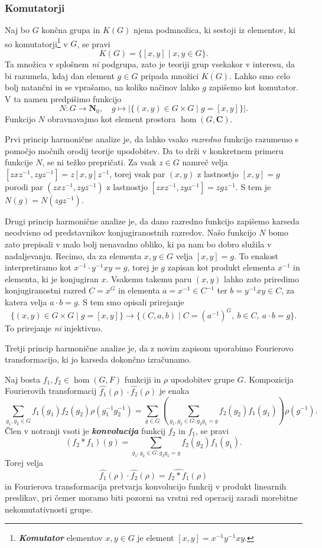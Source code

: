 \documentclass[11pt]{book}
\def\NN{\mathbf{N}}
\def\CC{\mathbf{C}}
\def\conclass{C}
\def\definicija{\color{rdeca}\bf\em}
\theoremstyle{definition}
\theoremstyle{zgled}
\theoremstyle{odprtproblem}
\theoremstyle{domacanaloga}
\theoremstyle{izrek}
\begin{document}
\subsubsection{Komutatorji}

Naj bo $G$ končna grupa in $K(G)$ njena podmnožica, ki sestoji iz elementov, ki so komutatorji\footnote{{\definicija Komutator} elementov $x,y \in G$ je element $[x,y] = x^{-1} y^{-1} x y$.} v $G$, se pravi
\[
    K(G) = \{ [x,y] \mid x,y \in G \}.
\]
Ta množica v splošnem \emph{ni} podgrupa, zato je teoriji grup vsekakor v interesu, da bi razumela, kdaj dan element $g \in G$ pripada množici $K(G)$. Lahko smo celo bolj natančni in se vprašamo, na koliko načinov lahko $g$ zapišemo kot komutator. V ta namen predpišimo funkcijo
\[
    N \colon G \to \NN_0, \quad
    g \mapsto |\{ (x,y) \in G \times G \mid g = [x,y] \}|.
\]
Funkcijo $N$ obravnavajmo kot element prostora $\hom(G,\CC)$. 

Prvi princip harmonične analize je, da lahko vsako \emph{razredno} funkcijo razumemo s pomočjo močnih orodij teorije upodobitev. Da to drži v konkretnem primeru funkcije $N$, se ni težko prepričati. Za vsak $z \in G$ namreč velja $[z x z^{-1}, z y z^{-1}] = z [x,y] z^{-1}$, torej vsak par $(x,y)$ z lastnostjo $[x,y] = g$ porodi par $(z x z^{-1}, z y z^{-1})$ z lastnostjo $[z x z^{-1}, z y z^{-1}] = z g z^{-1}$. S tem je $N(g) = N(z g z^{-1})$.

Drugi princip harmonične analize je, da dano razredno funkcijo zapišemo karseda neodvisno od predstavnikov konjugiranostnih razredov. Našo funkcijo $N$ bomo zato prepisali v malo bolj nenavadno obliko, ki pa nam bo dobro služila v nadaljevanju. Recimo, da za elementa $x,y \in G$ velja $[x,y] = g$. To enakost interpretiramo kot $x^{-1} \cdot y^{-1} x y = g$, torej je $g$ zapisan kot produkt elementa $x^{-1}$ in elementa, ki je konjugiran $x$. Vsakemu takemu paru $(x,y)$ lahko zato priredimo konjugiranostni razred $\conclass = x^G$ in elementa $a = x^{-1} \in \conclass^{-1}$ ter $b = y^{-1} x y \in \conclass$, za katera velja $a \cdot b = g$. S tem smo opisali prirejanje
\[
    \{ (x,y) \in G \times G \mid g = [x,y] \} \to 
    \{ (\conclass, a, b) \mid \conclass = (a^{-1})^G, \ b \in \conclass,\ a \cdot b = g \}.
\]
To prirejanje \emph{ni} injektivno. \todo{}

Tretji princip harmonične analize je, da z novim zapisom uporabimo Fourierovo transformacijo, ki jo karseda dokončno izračunamo.

Naj bosta $f_1, f_2 \in \hom(G,F)$ funkciji in $\rho$ upodobitev grupe $G$. Kompozicija Fourierovih transformacij $\widehat{f_1}(\rho) \cdot \widehat{f_2}(\rho)$ je enaka
\[
    \sum_{g_1, g_2 \in G} f_1(g_1) f_2(g_2) \rho(g_1^{-1} g_2^{-1}) =
    \sum_{g \in G} \left( \sum_{g_1, g_2 \in G \colon g_2 g_1 = g} f_2(g_2) f_1(g_1)  \right) \rho(g^{-1}).
\]
Člen v notranji vsoti je {\definicija konvolucija} funkcij $f_2$ in $f_1$, se pravi
\[
    (f_2 * f_1)(g) = \sum_{g_1, g_2 \in G \colon g_2 g_1 = g} f_2(g_2) f_1(g_1).
\]
Torej velja
\[
    \widehat{f_1}(\rho) \cdot \widehat{f_2}(\rho) =
    \widehat{f_2 * f_1}(\rho)
\]
in Fourierova transformacija pretvarja konvolucijo funkcij v produkt linearnih preslikav, pri čemer moramo biti pozorni na vrstni red operacij zaradi morebitne nekomutativnosti grupe.
\end{document}
